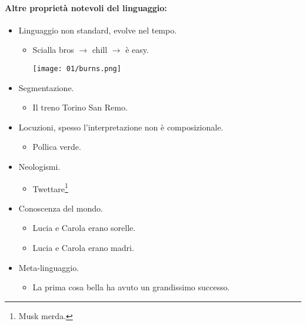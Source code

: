 

\paragraph{Altre proprietà notevoli del linguaggio:}

\begin{itemize}
  \item Linguaggio non standard, evolve nel tempo. 
    \begin{itemize}
      \item Scialla bros $\rightarrow$ chill $\rightarrow$ è easy. 
      \begin{center}
    \texttt{[image: 01/burns.png]}
  \end{center}
    \end{itemize}
  \item Segmentazione. 
    \begin{itemize}
      \item Il treno Torino San Remo. 
    \end{itemize}
  \item Locuzioni, spesso l'interpretazione non è composizionale. 
    \begin{itemize}
      \item Pollica verde.
    \end{itemize}
  \item Neologismi. 
    \begin{itemize}
      \item Twettare\footnote{Musk merda.}
    \end{itemize}
  \item Conoscenza del mondo. 
    \begin{itemize}
      \item Lucia e Carola erano sorelle. 
      \item Lucia e Carola erano madri.
    \end{itemize}
  \item Meta-linguaggio. 
    \begin{itemize}
      \item La prima cosa bella ha avuto un
grandissimo successo.
    \end{itemize}
\end{itemize} 

